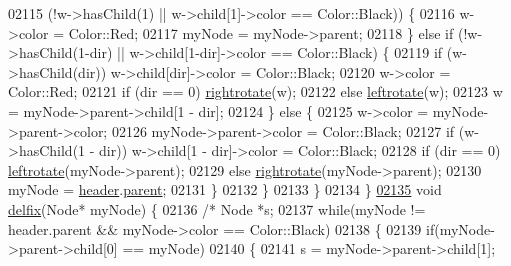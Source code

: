\begin{DoxyCode}
02115                         (!w->hasChild(1) || w->child[1]->color == Color::Black)) \{
02116                         w->color = Color::Red;
02117                         myNode = myNode->parent;
02118                     \} \textcolor{keywordflow}{else} \textcolor{keywordflow}{if} (!w->hasChild(1-dir) || w->child[1-dir]->color == Color::Black) \{
02119                         \textcolor{keywordflow}{if} (w->hasChild(dir)) w->child[dir]->color = Color::Black;
02120                         w->color = Color::Red;
02121                         if (dir == 0) \hyperlink{classaed2_1_1map_a816d69fa4dfe18a984dc3628fee14e2f_a816d69fa4dfe18a984dc3628fee14e2f}{rightrotate}(w);
02122                         \textcolor{keywordflow}{else} \hyperlink{classaed2_1_1map_ad764851f1534f2db0964c4f729056a1e_ad764851f1534f2db0964c4f729056a1e}{leftrotate}(w);
02123                         w = myNode->parent->child[1 - dir];
02124                     \} \textcolor{keywordflow}{else} \{
02125                         w->color = myNode->parent->color;
02126                         myNode->parent->color = Color::Black;
02127                         \textcolor{keywordflow}{if} (w->hasChild(1 - dir)) w->child[1 - dir]->color = Color::Black;
02128                         if (dir == 0) \hyperlink{classaed2_1_1map_ad764851f1534f2db0964c4f729056a1e_ad764851f1534f2db0964c4f729056a1e}{leftrotate}(myNode->parent);
02129                         \textcolor{keywordflow}{else} \hyperlink{classaed2_1_1map_a816d69fa4dfe18a984dc3628fee14e2f_a816d69fa4dfe18a984dc3628fee14e2f}{rightrotate}(myNode->parent);
02130                         myNode = \hyperlink{classaed2_1_1map_a92d93f905c8ad73fba18fdc7e8915cce_a92d93f905c8ad73fba18fdc7e8915cce}{header}.\hyperlink{structaed2_1_1map_1_1Node_ab6a5f9e471b311755e4a56834086cb90_ab6a5f9e471b311755e4a56834086cb90}{parent};
02131                     \}
02132                 \}
02133             \}
02134         \}
\hypertarget{map_8h_source.tex_l02135}{}\hyperlink{classaed2_1_1map_a056322ff63d37b43d042ffa0378c9fd2_a056322ff63d37b43d042ffa0378c9fd2}{02135}         \textcolor{keywordtype}{void} \hyperlink{classaed2_1_1map_a056322ff63d37b43d042ffa0378c9fd2_a056322ff63d37b43d042ffa0378c9fd2}{delfix}(Node* myNode) \{
02136             \textcolor{comment}{/* Node *s;}
02137 \textcolor{comment}{             while(myNode != header.parent && myNode->color == Color::Black)}
02138 \textcolor{comment}{             \{}
02139 \textcolor{comment}{                 if(myNode->parent->child[0] == myNode)}
02140 \textcolor{comment}{                 \{}
02141 \textcolor{comment}{                     s = myNode->parent->child[1];}

\end{DoxyCode}
